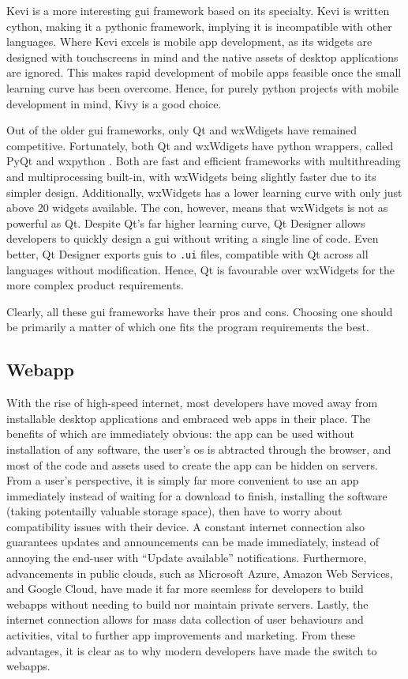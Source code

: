 \documentclass[11pt]{article}
\begin{document}
Kevi is a more interesting \acrshort{gui} \gls{framework} based on its specialty. Kevi is written \Gls{cython}, making it a \Gls{python}ic \gls{framework}, implying it is incompatible with other languages. Where Kevi excels is mobile app development, as its widgets are designed with touchscreens in mind and the native assets of desktop applications are ignored. This makes rapid development of mobile apps feasible once the small learning curve has been overcome. Hence, for purely \Gls{python} projects with mobile development in mind, Kivy is a good choice.

Out of the older \acrshort{gui} \glspl{framework}, only Qt and wxWdigets have remained competitive. Fortunately, both Qt and wxWdigets have \Gls{python} wrappers, called PyQt and wx\Gls{python} \cite{pyqt} \cite{wxpython}. Both are fast and efficient \glspl{framework} with multithreading and multiprocessing built-in, with wxWidgets being slightly faster due to its simpler design. Additionally, wxWidgets has a lower learning curve with only just above 20 widgets available. The con, however, means that wxWidgets is not as powerful as Qt. Despite Qt's far higher learning curve, Qt Designer allows developers to quickly design a \acrshort{gui} without writing a single line of code. Even better, Qt Designer exports \acrshort{gui}s to \texttt{.ui} files, compatible with Qt across all languages without modification. Hence, Qt is favourable over wxWidgets for the more complex product requirements.

Clearly, all these \acrshort{gui} \glspl{framework} have their pros and cons. Choosing one should be primarily a matter of which one fits the program requirements the best.

\subsection{Webapp}

With the rise of high-speed internet, most developers have moved away from installable desktop applications and embraced web apps in their place. The benefits of which are immediately obvious: the app can be used without installation of any software, the \gls{user}'s \acrshort{os} is abtracted through the \gls{browser}, and most of the code and assets used to create the app can be hidden on \gls{server}s. From a \gls{user}'s perspective, it is simply far more convenient to use an app immediately instead of waiting for a download to finish, installing the software (taking potentailly valuable storage space), then have to worry about compatibility issues with their device. A constant internet connection also guarantees updates and announcements can be made immediately, instead of annoying the end-user with ``Update available'' notifications. Furthermore, advancements in public clouds, such as Microsoft Azure, Amazon Web Services, and Google Cloud, have made it far more seemless for developers to build \gls{webapp}s without needing to build nor maintain private \gls{server}s. Lastly, the internet connection allows for mass data collection of user behaviours and activities, vital to further app improvements and marketing. From these advantages, it is clear as to why modern developers have made the switch to \gls{webapp}s.
\end{document}
